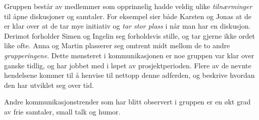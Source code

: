 Gruppen består av medlemmer som opprinnelig hadde veldig ulike \textit{tilnærminger} til åpne diskusjoner og samtaler.
For eksempel sier både Karsten og Jonas at de er klar over at de tar mye initiativ og \textit{tar stor plass} i når man har en diskusjon.
Derimot forholder Simen og Ingelin seg forholdsvis stille, og tar gjerne ikke ordet like ofte.
Anna og Martin plasserer seg omtrent midt mellom de to andre \textit{grupperingene}.
Dette mønsteret i kommunikasjonen er noe gruppen var klar over ganske tidlig, og har jobbet med i løpet av prosjektperioden.
Flere av de nevnte hendelsene kommer til å henvise til nettopp denne adferden, og beskrive hvordan den har utviklet seg over tid.

Andre kommunikasjonstrender som har blitt observert i gruppen er en økt grad av frie samtaler, small talk og humor.









